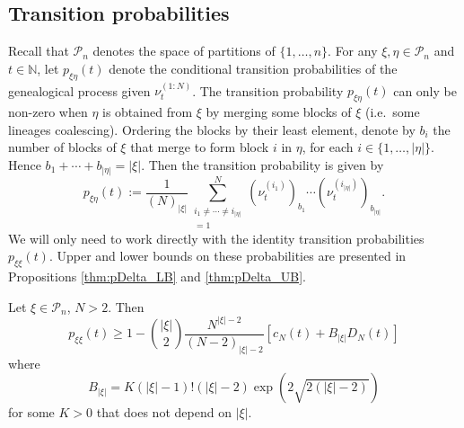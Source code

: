 \subsection{Transition probabilities}
Recall that $\mathcal{P}_n$ denotes the space of partitions of $\{1,\dots,n\}$.
For any $\xi, \eta \in \mathcal{P}_n$ and $t\in\mathbb{N}$, let $p_{\xi\eta}(t)$ denote the conditional transition probabilities of the genealogical process given $\nu_t^{(1:N)}$. %
The transition probability $p_{\xi\eta}(t)$ can only be non-zero when $\eta$ is obtained from $\xi$ by merging some blocks of $\xi$ (i.e.\ some lineages coalescing).
Ordering the blocks by their least element, denote by $b_i$ the number of blocks of $\xi$ that merge to form block $i$ in $\eta$, for each $i \in \{1,\dots, |\eta|\}$. Hence $b_1 + \cdots + b_{|\eta|} = |\xi|$.
Then the transition probability is given by
\begin{equation}\label{eq:defn_pxieta}
p_{\xi\eta}(t) 
:= \frac{1}{(N)_{|\xi|}} \sum_{\substack{i_1 \neq \cdots \neq i_{|\eta|} \\ =1}}^N
        (\nu_t^{(i_1)})_{b_1} \cdots (\nu_t^{(i_{|\eta|})})_{b_{|\eta|}} .
\end{equation}
We will only need to work directly with the identity transition probabilities $p_{\xi\xi}(t)$.
Upper and lower bounds on these probabilities are presented in Propositions \ref{thm:pDelta_LB} and \ref{thm:pDelta_UB}.
\begin{prop}%
\label{thm:pDelta_LB}
Let $\xi \in \mathcal{P}_n$, $N>2$. Then
\begin{equation*}
p_{\xi\xi}(t)
\geq 1 - \binom{|\xi|}{2} \frac{N^{|\xi|-2}}{(N-2)_{|\xi|-2}} \left[ c_N(t) + B_{|\xi|} D_N(t) \right]
\end{equation*}
where 
\begin{equation*}
B_{|\xi|} = K (|\xi|-1)! (|\xi|-2) \exp( 2 \sqrt{2(|\xi|-2)} )
\end{equation*}
for some $K>0$ that does not depend on $|\xi|$.
\end{prop}
